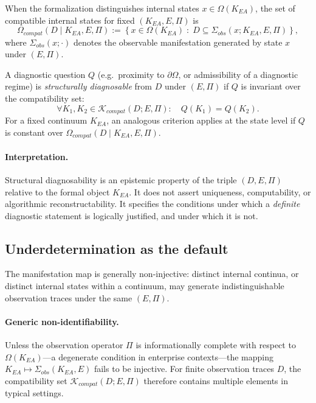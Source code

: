 \begin{definition}
\label{def:state_level_compatibility}
When the formalization distinguishes internal states $x \in \Omega(K_{EA})$, the
set of compatible internal states for fixed $(K_{EA},E,\Pi)$ is
\[
\Omega_{compat}(D \mid K_{EA},E,\Pi)
:= \left\{x \in \Omega(K_{EA}) \;:\; D \subseteq \Sigma_{obs}(x;K_{EA},E,\Pi)\right\},
\]
where $\Sigma_{obs}(x;\cdot)$ denotes the observable manifestation generated by
state $x$ under $(E,\Pi)$.
\end{definition}

\begin{definition}
\label{def:structural_diagnosability}
A diagnostic question $Q$ (e.g.\ proximity to $\partial\Omega$, or admissibility
of a diagnostic regime) is \emph{structurally diagnosable} from $D$ under $(E,\Pi)$
if $Q$ is invariant over the compatibility set:
\[
\forall K_1,K_2 \in \mathcal{K}_{compat}(D;E,\Pi):\quad Q(K_1) = Q(K_2).
\]
For a fixed continuum $K_{EA}$, an analogous criterion applies at the state level
if $Q$ is constant over $\Omega_{compat}(D \mid K_{EA},E,\Pi)$.
\end{definition}

\paragraph{Interpretation.}
Structural diagnosability is an epistemic property of the triple $(D,E,\Pi)$
relative to the formal object $K_{EA}$.
It does not assert uniqueness, computability, or algorithmic reconstructability.
It specifies the conditions under which a \emph{definite} diagnostic statement is
logically justified, and under which it is not.

\subsection{Underdetermination as the default}
The manifestation map is generally non-injective: distinct internal continua, or
distinct internal states within a continuum, may generate indistinguishable
observation traces under the same $(E,\Pi)$.

\paragraph{Generic non-identifiability.}
Unless the observation operator $\Pi$ is informationally complete with respect to
$\Omega(K_{EA})$—a degenerate condition in enterprise contexts—the mapping
$K_{EA} \mapsto \Sigma_{obs}(K_{EA},E)$ fails to be injective.
For finite observation traces $D$, the compatibility set
$\mathcal{K}_{compat}(D;E,\Pi)$ therefore contains multiple elements in typical
settings.

